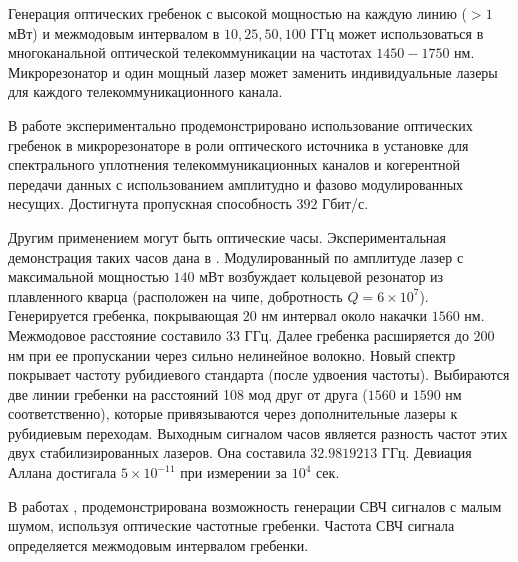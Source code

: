 Генерация оптических гребенок с высокой мощностью на каждую линию ($>1$ мВт) и межмодовым интервалом в $10,25,50,100$ ГГц может использоваться в многоканальной оптической телекоммуникации на частотах $1450-1750$ нм. Микрорезонатор и один мощный лазер может заменить индивидуальные лазеры для каждого телекоммуникационного канала.

В работе \cite{Pfeifle2014} экспериментально продемонстрировано использование оптических гребенок в микрорезонаторе в роли оптического источника в установке для спектрального уплотнения телекоммуникационных каналов и когерентной передачи данных с использованием амплитудно и фазово модулированных несущих. Достигнута пропускная способность $392$ Гбит/с.

Другим применением могут быть оптические часы. Экспериментальная демонстрация таких часов дана в \cite{Papp2014}. Модулированный по амплитуде лазер с максимальной мощностью $140$ мВт возбуждает кольцевой резонатор из плавленного кварца (расположен на чипе, добротность $Q=6\times10^7$). Генерируется гребенка, покрывающая $20$ нм интервал около накачки $1560$ нм. Межмодовое расстояние составило $33$ ГГц. Далее гребенка расширяется до $200$ нм при ее пропускании через сильно нелинейное волокно. Новый спектр покрывает частоту рубидиевого стандарта (после удвоения частоты). Выбираются две линии гребенки на расстояний 108 мод друг от друга ($1560$ и $1590$ нм соответственно), которые привязываются через дополнительные лазеры к рубидиевым переходам. Выходным сигналом часов является разность частот этих двух стабилизированных лазеров. Она составила $32.9819213$ ГГц. Девиация Аллана достигала $5\times10^{-11}$ при измерении за $10^4$ сек.

В работах \cite{Herr2012}, \cite{Savchenkov2008} продемонстрирована возможность генерации СВЧ сигналов с малым шумом, используя оптические частотные гребенки. Частота СВЧ сигнала определяется межмодовым интервалом гребенки.



